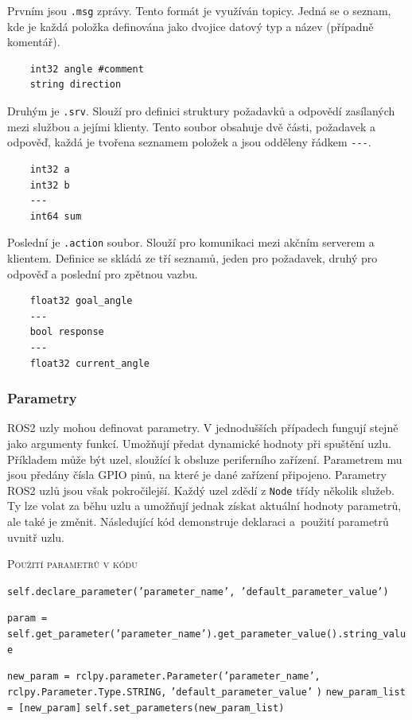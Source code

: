 Prvním jsou \verb|.msg| zprávy. Tento formát je využíván topicy. Jedná se o seznam, kde je každá položka definována jako dvojice datový typ a název (případně komentář).
\begin{verbatim}
	int32 angle #comment
	string direction
\end{verbatim}

Druhým je \verb|.srv|. Slouží pro definici struktury požadavků a odpovědí zasílaných mezi službou a jejími klienty. Tento soubor obsahuje dvě části, požadavek a odpověď, každá je tvořena seznamem položek a jsou odděleny řádkem \verb|---|. 
\begin{verbatim}
	int32 a
	int32 b
	---
	int64 sum
\end{verbatim}

Poslední je \verb|.action| soubor. Slouží pro komunikaci mezi akčním serverem a klientem. Definice se skládá ze tří seznamů, jeden pro požadavek, druhý pro odpověď a poslední pro zpětnou vazbu.
\begin{verbatim}
	float32 goal_angle
	---
	bool response
	---
	float32 current_angle
\end{verbatim}

\subsubsection*{Parametry}
ROS2 uzly mohou definovat parametry. V jednodušších případech fungují stejně jako argumenty funkcí. Umožňují předat dynamické hodnoty při spuštění uzlu. Příkladem může být uzel, sloužící k obsluze periferního zařízení. Parametrem mu jsou předány čísla GPIO pinů, na které je dané zařízení připojeno. Parametry ROS2 uzlů jsou však pokročilejší. Každý uzel zdědí z \verb|Node| třídy několik služeb. Ty lze volat za běhu uzlu a umožňují jednak získat aktuální hodnoty parametrů, ale také je změnit. Následující kód demonstruje deklaraci a~použití parametrů uvnitř uzlu. \cite[str:~37-39]{ros2_introduction}

\begin{algorithm}[h!]
	\label{}
	\caption{\textsc{Použití parametrů v kódu}}
	
	\DontPrintSemicolon
	\SetAlgoNoLine
	\SetNlSty{}{}{:}
	\SetNlSkip{-1.1em}
	
	\BlankLine \Indp\Indpp
	
    \texttt{self.declare\_parameter('parameter\_name', 'default\_parameter\_value')}\;
	
	\BlankLine
	\texttt{param = self.get\_parameter('parameter\_name').get\_parameter\_value().string\_value}\;
	
	\BlankLine
	\texttt{new\_param = rclpy.parameter.Parameter('parameter\_name',}\;
	\Indp\Indp
	\texttt{rclpy.Parameter.Type.STRING,}\;
	\texttt{'default\_parameter\_value'}\;
	\Indm\Indm
	\texttt{)}\;
	\texttt{new\_param\_list = [new\_param]}\;
	\texttt{self.set\_parameters(new\_param\_list)}\;

\end{algorithm}

